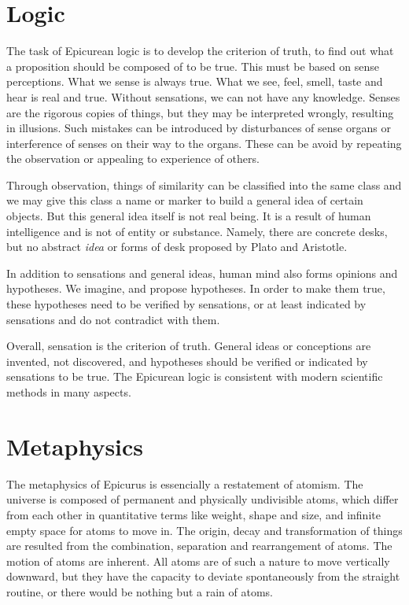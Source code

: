 \documentclass[11pt]{article}
\begin{document}
\section{Logic}
The task of Epicurean logic is to develop the criterion of truth, to find out what a proposition should be composed of to be true. 
This must be based on sense perceptions. 
What we sense is always true. 
What we see, feel, smell, taste and hear is real and true. 
Without sensations, we can not have any knowledge. 
Senses are the rigorous copies of things, but they may be interpreted wrongly, resulting in illusions. 
Such mistakes can be introduced by disturbances of sense organs or interference of senses on their way to the organs. 
These can be avoid by repeating the observation or appealing to experience of others.

\newline

Through observation, things of similarity can be classified into the same class and we may give this class a name or marker to build a general idea of certain objects. 
But this general idea itself is not real being. 
It is a result of human intelligence and is not of entity or substance. 
Namely, there are concrete desks, but no abstract \textit{idea} or forms of desk proposed by Plato and Aristotle.

\newline

In addition to sensations and general ideas, human mind also forms opinions and hypotheses. 
We imagine, and propose hypotheses. 
In order to make them true, these hypotheses need to be verified by sensations, or at least indicated by sensations and do not contradict with them.

\newline

Overall, sensation is the criterion of truth. 
General ideas or conceptions are invented, not discovered, and hypotheses should be verified or indicated by sensations to be true. 
The Epicurean logic is consistent with modern scientific methods in many aspects.

\section{Metaphysics}
The metaphysics of Epicurus is essencially a restatement of atomism. 
The universe is composed of permanent and physically undivisible atoms, which differ from each other in quantitative terms like weight, shape and size, and infinite empty space for atoms to move in. 
The origin, decay and transformation of things are resulted from the combination, separation and rearrangement of atoms. 
The motion of atoms are inherent. 
All atoms are of such a nature to move vertically downward, but they have the capacity to deviate spontaneously from the straight routine, or there would be nothing but a rain of atoms.
\end{document}
